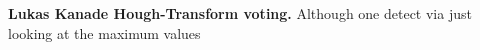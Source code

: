 \documentclass[runningheads]{llncs}
\begin{document}
\textbf{Lukas Kanade Hough-Transform voting.} Although one detect via just looking at the maximum values 







\end{document}
